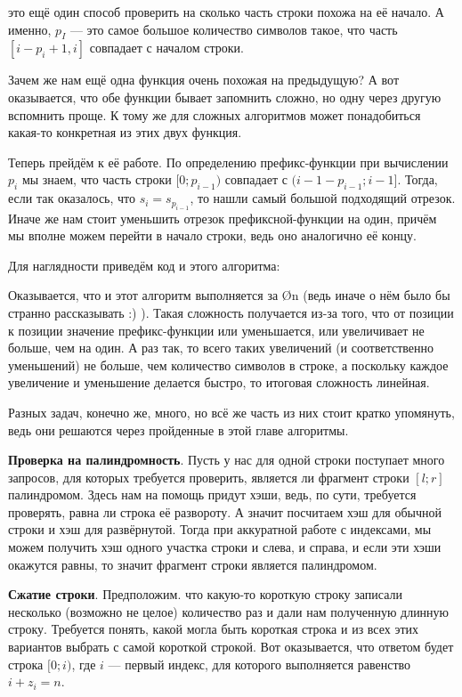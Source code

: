 

 это ещё один способ проверить на сколько часть строки похожа на её начало. А именно, $p_I$ — это самое большое количество символов такое, что часть $[i - p_i + 1, i]$ совпадает с началом строки.

Зачем же нам ещё одна функция очень похожая на предыдущую? А вот оказывается, что обе функции бывает запомнить сложно, но одну через другую вспомнить проще. К тому же для сложных алгоритмов может понадобиться какая-то конкретная из этих двух функция.

Теперь прейдём к её работе. По определению префикс-функции при вычислении $p_i$ мы знаем, что часть строки $[0; p_{i - 1})$ совпадает с $(i - 1 - p_{i - 1}; i - 1]$. Тогда, если так оказалось, что $s_i = s_{p_{i - 1}}$, то нашли самый большой подходящий отрезок. Иначе же нам стоит уменьшить отрезок префиксной-функции на один, причём мы вполне можем перейти в начало строки, ведь оно аналогично её концу.

Для наглядности приведём код и этого алгоритма:


Оказывается, что и этот алгоритм выполняется за \O{n} (ведь иначе о нём было бы странно рассказывать :) ). Такая сложность получается из-за того, что от позиции к позиции значение префикс-функции или уменьшается, или увеличивает не больше, чем на один. А раз так, то всего таких увеличений (и соответственно уменьшений) не больше, чем количество символов в строке, а поскольку каждое увеличение и уменьшение делается быстро, то итоговая сложность линейная.


Разных задач, конечно же, много, но всё же часть из них стоит кратко упомянуть, ведь они решаются через пройденные в этой главе алгоритмы. 

\textbf{Проверка на палиндромность}. Пусть у нас для одной строки поступает много запросов, для которых требуется проверить, является ли фрагмент строки $[l; r]$ палиндромом. Здесь нам на помощь придут хэши, ведь, по сути, требуется проверять, равна ли строка её развороту. А значит посчитаем хэш для обычной строки и хэш для развёрнутой. Тогда при аккуратной работе с индексами, мы можем получить хэш одного участка строки и слева, и справа, и если эти хэши окажутся равны, то значит фрагмент строки является палиндромом.

\textbf{Сжатие строки}. Предположим. что какую-то короткую строку записали несколько (возможно не целое) количество раз и дали нам полученную длинную строку. Требуется понять, какой могла быть короткая строка и из всех этих вариантов выбрать с самой короткой строкой. Вот оказывается, что ответом будет строка $[0; i)$, где $i$ — первый индекс, для которого выполняется равенство $i + z_i = n$.

